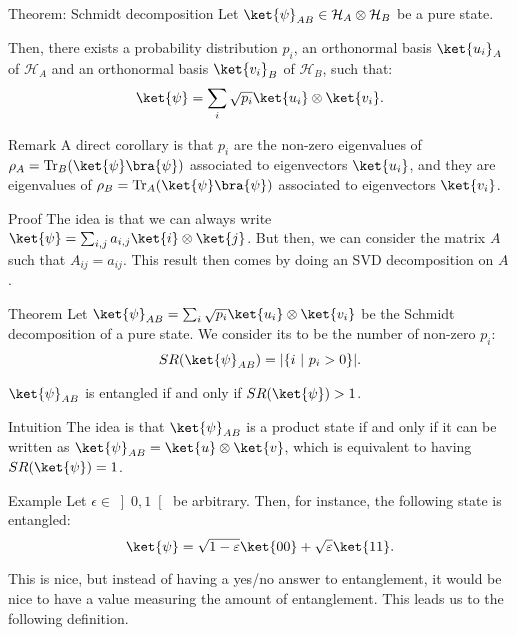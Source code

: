 \documentclass[a4paper]{article}
\begin{document}
\begin{parag}{Theorem: Schmidt decomposition}
    Let $\ket{\psi}_{AB} \in \mathcal{H}_A \otimes \mathcal{H}_B$ be a pure state.

    Then, there exists a probability distribution $p_i$, an orthonormal basis $\ket{u_i}_A$ of $\mathcal{H}_A$ and an orthonormal basis $\ket{v_i}_B$ of $\mathcal{H}_B$, such that: 
    \[\ket{\psi} = \sum_{i} \sqrt{p_i} \ket{u_i} \otimes \ket{v_i}.\]

    \begin{subparag}{Remark}
        A direct corollary is that $p_i$ are the non-zero eigenvalues of $\rho_A = \Tr_B\left(\ket{\psi}\bra{\psi}\right)$ associated to eigenvectors $\ket{u_i}$, and they are eigenvalues of $\rho_B = \Tr_A\left(\ket{\psi}\bra{\psi}\right)$ associated to eigenvectors $\ket{v_i}$.
    \end{subparag}
    
    \begin{subparag}{Proof}
        The idea is that we can always write $\ket{\psi} = \sum_{i, j} a_{i, j} \ket{i} \otimes \ket{j}$. But then, we can consider the matrix $A$ such that $A_{ij} = a_{ij}$. This result then comes by doing an SVD decomposition on $A$.
    \end{subparag}
\end{parag}

\begin{parag}{Theorem}
    Let $\ket{\psi}_{AB} = \sum_{i} \sqrt{p_i} \ket{u_i} \otimes \ket{v_i}$ be the Schmidt decomposition of a pure state. We consider its  to be the number of non-zero $p_i$: 
    \[SR\left(\ket{\psi}_{AB}\right) = \left|\left\{i \suchthat p_i > 0\right\}\right|.\]

    $\ket{\psi}_{AB}$ is entangled if and only if $SR\left(\ket{\psi}\right) > 1$.

    \begin{subparag}{Intuition}
        The idea is that $\ket{\psi}_{AB}$ is a product state if and only if it can be written as $\ket{\psi}_{AB} = \ket{u} \otimes \ket{v}$, which is equivalent to having $SR\left(\ket{\psi}\right) = 1$.
    \end{subparag}

    \begin{subparag}{Example}
        Let $\epsilon \in \left]0, 1\right[ $ be arbitrary. Then, for instance, the following state is entangled: 
        \[\ket{\psi} = \sqrt{1 - \epsilon} \ket{00} + \sqrt{\epsilon} \ket{11}.\]

        This is nice, but instead of having a yes/no answer to entanglement, it would be nice to have a value measuring the amount of entanglement. This leads us to the following definition.
    \end{subparag}
\end{parag}
\end{document}
